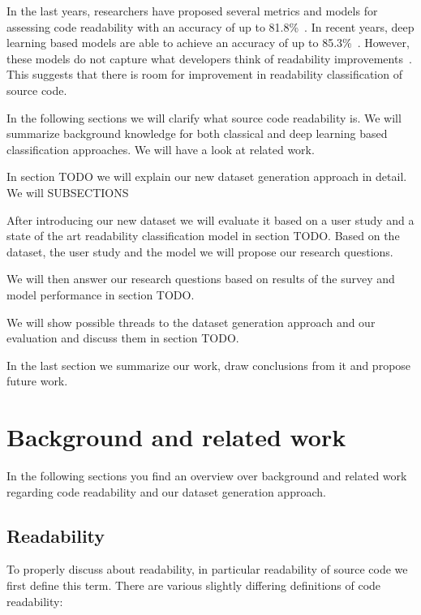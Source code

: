 \documentclass[%
class=scrreprt,
chapterprefix=false,%
open=right,%
twoside=false,%
paper=a4,%
logofile={Logo\_zentral\_farbig\_EN.png},%
thesistype=master,%
UKenglish,%
]{se2thesis}
\begin{document}
	In the last years, researchers have proposed several metrics and models for assessing code readability with an accuracy of up to 81.8\%~\cite{buse2009learning, posnett2011simpler, dorn2012general, daka2015modeling}. In recent years, deep learning based models are able to achieve an accuracy of up to 85.3\%~\cite{mi2018improving, mi2022towards}.
	However, these models do not capture what developers think of readability improvements~\cite{fakhoury2019improving}. This suggests that there is room for improvement in readability classification of source code. 
	
	In the following sections we will clarify what source code readability is. We will summarize background knowledge for both classical and deep learning based classification approaches. We will have a look at related work.
	
	In section TODO we will explain our new dataset generation approach in detail. We will SUBSECTIONS
	
	After introducing our new dataset we will evaluate it based on a user study and a state of the art readability classification model in section TODO. Based on the dataset, the user study and the model we will propose our research questions.
	
	We will then answer our research questions based on results of the survey and model performance in section TODO.
	
	We will show possible threads to the dataset generation approach and our evaluation and discuss them in section TODO.
	
	In the last section we summarize our work, draw conclusions from it and propose future work.
	
	\section{Background and related work} \label{Background and related work}
	In the following sections you find an overview over background and related work regarding code readability and our dataset generation approach.
	
	\subsection{Readability} \label{Readability}
	To properly discuss about readability, in particular readability of source code we first define this term. There are various slightly differing definitions of code readability:
	
\end{document}
